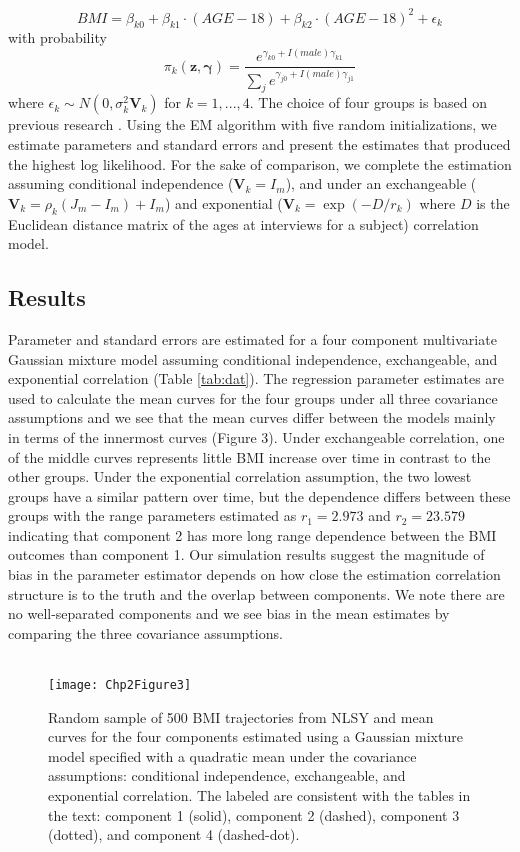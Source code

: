 \documentclass[10pt]{article}
\newcommand{\B}[0]{\mathbf}
\newcommand{\bs}[0]{\boldsymbol}
\begin{document}
$$BMI=\beta_{k0}+\beta_{k1}\cdot (AGE-18)+\beta_{k2}\cdot (AGE-18)^{2}+\epsilon_{k}$$
with probability
$$\pi_{k}(\B z,\bs\gamma)=\frac{e^{\gamma_{k0}+I(male)\gamma_{k1}}}{\sum_{j}e^{\gamma_{j0}+I(male)\gamma_{j1}}}$$
where $\epsilon_{k}\sim N(0,\sigma_{k}^{2}\B V_k)$
for $k=1,...,4$. The choice of four groups is based on previous research \cite{ostbye2011}. Using the EM algorithm with five random initializations, we estimate parameters and standard errors and present the estimates that produced the highest log likelihood. For the sake of comparison, we complete the estimation assuming conditional independence ($\B V_k  = I_m$), and under an exchangeable ($\B V_k = \rho_k(J_m - I_m)+I_m$) and exponential ($\B V_k = \exp(-D/r_k)$ where $D$ is the Euclidean distance matrix of the ages at interviews for a subject) correlation model.
\subsection{Results}
Parameter and standard errors are estimated for a four component multivariate Gaussian mixture model assuming conditional independence, exchangeable, and exponential correlation (Table \ref{tab:dat}). The regression parameter estimates are used to calculate the mean curves for the four groups under all three covariance assumptions and we see that the mean curves differ between the models mainly in terms of the innermost curves (Figure 3).  Under exchangeable correlation, one of the middle curves represents little BMI increase over time in contrast to the other groups. Under the exponential correlation assumption, the two lowest groups have a similar pattern over time, but the dependence differs between these groups with the range parameters estimated as $r_1=2.973$ and $r_2=23.579$ indicating that component 2 has more long range dependence between the BMI outcomes than component 1. Our simulation results suggest the magnitude of bias in the parameter estimator depends on how close the estimation correlation structure is to the truth and the overlap between components. We note there are no well-separated components and we see bias in the mean estimates by comparing the three covariance assumptions. \\\\
\begin{figure}
\begin{center}
\texttt{[image: Chp2Figure3]}
\end{center}
\caption{Random sample of 500 BMI trajectories from NLSY and mean curves for the four components estimated using a Gaussian mixture model specified with a quadratic mean under the covariance assumptions: conditional independence, exchangeable, and exponential correlation. The labeled are consistent with the tables in the text: component 1 (solid), component 2 (dashed), component 3 (dotted), and component 4 (dashed-dot). }
\label{fig:3}
\end{figure}
\end{document}
